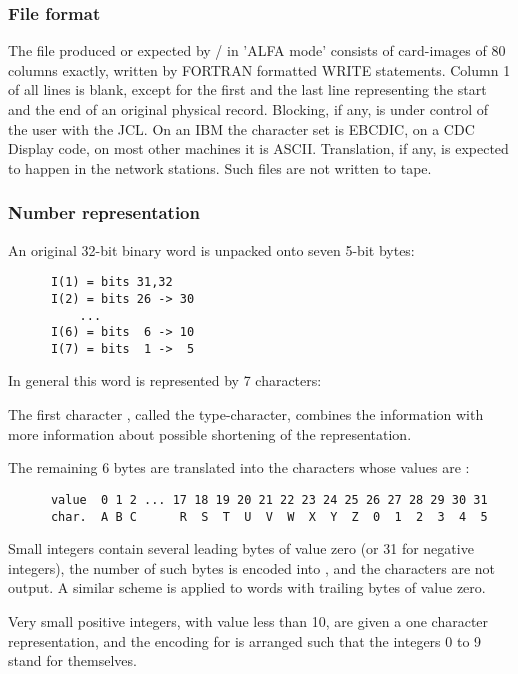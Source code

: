\subsubsection*{File format}

The file produced or expected by / 
in 'ALFA mode' consists
of card-images of 80 columns exactly, written by FORTRAN formatted
WRITE statements.
Column 1 of all lines is blank,
except for the first and the last line representing
the start and the end of an original physical record.
Blocking, if any, is under control of the user with the JCL.
On an IBM the character set is EBCDIC,
on a CDC Display code, on most other machines it is ASCII.
Translation, if any, is expected to happen in the network
stations.
Such files are not written to tape.

\subsubsection*{Number representation}

An original 32-bit binary word is unpacked onto seven 5-bit bytes:

\begin{verbatim}
      I(1) = bits 31,32
      I(2) = bits 26 -> 30
          ...
      I(6) = bits  6 -> 10
      I(7) = bits  1 ->  5
\end{verbatim}

In general this word is represented by 7 characters:

The first character , called the type-character,
combines the information  with more information about possible
shortening of the representation.

The remaining 6 bytes  are translated into the characters 
whose  values are :

\begin{verbatim}
      value  0 1 2 ... 17 18 19 20 21 22 23 24 25 26 27 28 29 30 31
      char.  A B C      R  S  T  U  V  W  X  Y  Z  0  1  2  3  4  5
\end{verbatim}


Small integers contain several leading bytes of value zero
(or 31 for negative integers),
the number  of such bytes is encoded into ,
and the characters  are not output.
A similar scheme is applied to words with trailing bytes
 of value zero.

Very small positive integers, with value less than 10,
are given a one character representation,
and the encoding for  is arranged such that the integers
0 to 9 stand for themselves.

